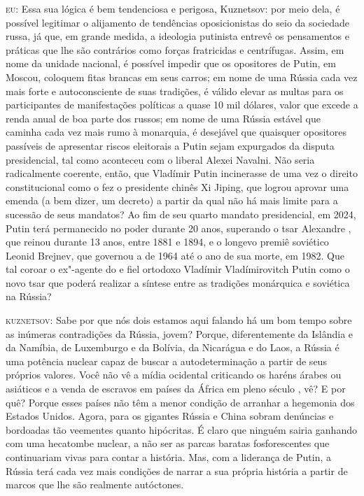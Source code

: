 \textsc{eu:} Essa sua lógica é bem tendenciosa e perigosa, Kuznetsov:
por meio dela, é possível legitimar o alijamento de tendências
oposicionistas do seio da sociedade russa, já que, em grande medida, a
ideologia putinista entrevê os pensamentos e práticas que lhe são
contrários como forças fratricidas e centrífugas. Assim, em nome da
unidade nacional, é possível impedir que os opositores de Putin, em
Moscou, coloquem fitas brancas em seus carros; em nome de uma Rússia
cada vez mais forte e autoconsciente de suas tradições, é válido elevar
as multas para os participantes de manifestações políticas a quase 10
mil dólares, valor que excede a renda anual de boa parte dos russos; em
nome de uma Rússia estável que caminha cada vez mais rumo à monarquia, é
desejável que quaisquer opositores passíveis de apresentar riscos
eleitorais a Putin sejam expurgados da disputa presidencial, tal como
aconteceu com o liberal Alexei Navalni. Não seria radicalmente coerente,
então, que Vladímir Putin incinerasse de uma vez o direito
constitucional como o fez o presidente chinês Xi Jiping, que logrou
aprovar uma emenda (a bem dizer, um decreto) a partir da qual não há
mais limite para a sucessão de seus mandatos? Ao fim de seu quarto
mandato presidencial, em 2024, Putin terá permanecido no poder durante
20 anos, superando o tsar Alexandre , que reinou durante 13 anos,
entre 1881 e 1894, e o longevo premiê soviético Leonid Brejnev, que
governou a  de 1964 até o ano de sua morte, em 1982. Que tal coroar
o ex"-agente do  e fiel ortodoxo Vladímir Vladímirovitch Putin como o
novo tsar que poderá realizar a síntese entre as tradições monárquica e
soviética na Rússia?

\textsc{kuznetsov:} Sabe por que nós dois estamos aqui falando há um bom
tempo sobre as inúmeras contradições da Rússia, jovem? Porque,
diferentemente da Islândia e da Namíbia, de Luxemburgo e da Bolívia, da
Nicarágua e do Laos, a Rússia é uma potência nuclear capaz de buscar a
autodeterminação a partir de seus próprios valores. Você não vê a mídia
ocidental criticando os haréns árabes ou asiáticos e a venda de escravos
em países da África em pleno século , vê? E por quê? Porque esses
países não têm a menor condição de arranhar a hegemonia dos Estados
Unidos. Agora, para os gigantes Rússia e China sobram denúncias e
bordoadas tão veementes quanto hipócritas. É claro que ninguém sairia
ganhando com uma hecatombe nuclear, a não ser as parcas baratas
fosforescentes que continuariam vivas para contar a história. Mas, com a
liderança de Putin, a Rússia terá cada vez mais condições de narrar a
sua própria história a partir de marcos que lhe são realmente
autóctones.

